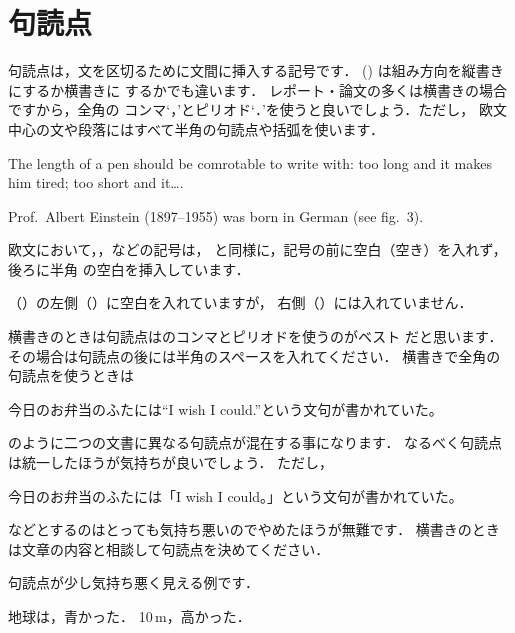 \section{句読点}
%

句読点は，文を区切るために文間に挿入する記号です．
%
 () は組み方向を縦書きにするか横書きに
するかでも違います．%
%
%
レポート・論文の多くは横書きの場合ですから，全角の
コンマ`，'とピリオド`．'を使うと良いでしょう．ただし，
欧文中心の文や段落にはすべて半角の句読点や括弧を使います．
\begin{InOut}
The length of a pen should be 
comrotable to write with: too long 
and it makes him tired; too short 
and it\ldots.\par Prof.~Albert 
Einstein (1897--1955) was born in 
German (see fig.~3).
\end{InOut}
欧文において，，などの記号は，
と同様に，記号の前に空白（空き）を入れず，後ろに半角
の空白を挿入しています．

（）の左側（）に空白を入れていますが，
右側（）には入れていません．


横書きのときは句読点はのコンマとピリオドを使うのがベスト
だと思います．その場合は句読点の後には半角のスペースを入れてください．
横書きで全角の句読点を使うときは
\begin{OutText}
今日のお弁当のふたには``I wish I could.''という文句が書かれていた。
\end{OutText}
のように二つの文書に異なる句読点が混在する事になります．
なるべく句読点は統一したほうが気持ちが良いでしょう．
ただし，
\begin{OutText}
今日のお弁当のふたには「I wish I could。」という文句が書かれていた。
\end{OutText}
などとするのはとっても気持ち悪いのでやめたほうが無難です．
横書きのときは文章の内容と相談して句読点を決めてください．

句読点が少し気持ち悪く見える例です．
\begin{InOut}
地球は，青かった． 10\,m，高かった．
\end{InOut}

